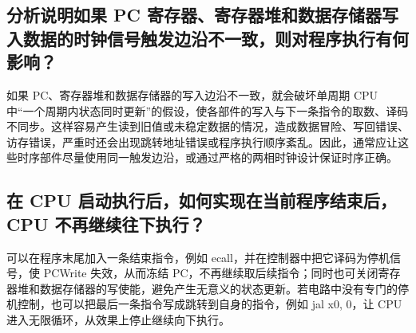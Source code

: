 \documentclass[UTF8,a4paper,11pt]{ctexart}
\newcommand{\placeholder}[1]{
\begin{tcolorbox}[colback=sub,colframe=main,boxrule=0.6pt,arc=2mm,left=2mm,right=2mm,top=1mm,bottom=1mm]
#1
\end{tcolorbox}
}
\begin{document}
\subsection{分析说明如果 PC 寄存器、寄存器堆和数据存储器写入数据的时钟信号触发边沿不一致，则对程序执行有何影响？}
\placeholder{
    如果 PC、寄存器堆和数据存储器的写入边沿不一致，就会破坏单周期 CPU 中“一个周期内状态同时更新”的假设，使各部件的写入与下一条指令的取数、译码不同步。这样容易产生读到旧值或未稳定数据的情况，造成数据冒险、写回错误、访存错误，严重时还会出现跳转地址错误或程序执行顺序紊乱。因此，通常应让这些时序部件尽量使用同一触发边沿，或通过严格的两相时钟设计保证时序正确。
}

\subsection{在 CPU 启动执行后，如何实现在当前程序结束后，CPU 不再继续往下执行？}
\placeholder{
    可以在程序末尾加入一条结束指令，例如 ecall，并在控制器中把它译码为停机信号，使 PCWrite 失效，从而冻结 PC，不再继续取后续指令；同时也可关闭寄存器堆和数据存储器的写使能，避免产生无意义的状态更新。若电路中没有专门的停机控制，也可以把最后一条指令写成跳转到自身的指令，例如 jal x0, 0，让 CPU 进入无限循环，从效果上停止继续向下执行。
}
\end{document}
